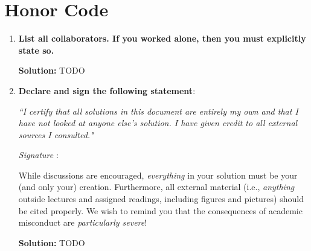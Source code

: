 \documentclass{article}
\newcommand{\Question}[1]{\Large \section{ #1 } \normalsize}
\newenvironment{solution}{\color{blue} \smallskip \textbf{Solution:}}{}
\begin{document}
\newpage
\Question{Honor Code}

\begin{enumerate}
    \item 
    \textbf{List all collaborators. If you worked alone, then you must explicitly state so.}

    \begin{solution}
        TODO
    \end{solution}

    \item
    \textbf{Declare and sign the following statement}: 
    
    \textit{``I certify that all solutions in this document are entirely my own and that I have not looked at anyone else's solution. I have given credit to all external sources I consulted."}
    
    \textit{Signature} : \hrulefill
    
    While discussions are encouraged, \emph{everything} in your solution must be your (and only your) creation. 
    Furthermore, all external material  (i.e., \emph{anything} outside lectures and assigned
    readings, including figures and pictures) should be cited properly.
    We wish to remind you that the consequences of academic misconduct are \emph{particularly severe}!

    \begin{solution}
        TODO
    \end{solution}

\end{enumerate}
\end{document}
